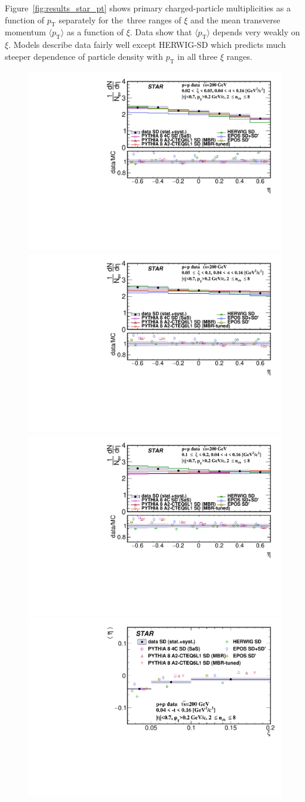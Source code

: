 Figure~\ref{fig:results_star_pt} shows primary charged-particle multiplicities as a function of $p_\textrm{T}$  separately for the~three ranges of $\xi$ and the mean transverse momentum $\langle p_\textrm{T}\rangle$ as a function of $\xi$. Data show that $\langle p_\textrm{T}\rangle$ depends very weakly on $\xi$. Models describe data fairly well except HERWIG-SD which predicts much steeper dependence of particle density with $p_\textrm{T}$ in all three $\xi$ ranges. %
\begin{figure}[h!]
	\centering
	\includegraphics[width=.49\textwidth,page=1]{chapters/chrgSTAR/img/results/out_eta_SD_0.pdf}
	\hfill
	\includegraphics[width=.49\textwidth,page=1]{chapters/chrgSTAR/img/results/out_eta_SD_1.pdf}
	\newline
	\includegraphics[width=.49\textwidth,page=1]{chapters/chrgSTAR/img/results/out_eta_SD_2.pdf}
	\hfill
	\includegraphics[width=.49\textwidth,page=1]{chapters/chrgSTAR/img/results/mean_eta_xi.pdf}

\end{figure}
